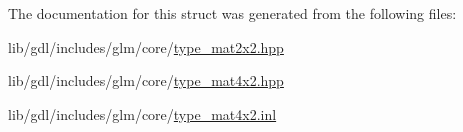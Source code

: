 The documentation for this struct was generated from the following files\+:\begin{DoxyCompactItemize}
\item 
lib/gdl/includes/glm/core/\hyperlink{type__mat2x2_8hpp}{type\+\_\+mat2x2.\+hpp}\item 
lib/gdl/includes/glm/core/\hyperlink{type__mat4x2_8hpp}{type\+\_\+mat4x2.\+hpp}\item 
lib/gdl/includes/glm/core/\hyperlink{type__mat4x2_8inl}{type\+\_\+mat4x2.\+inl}\end{DoxyCompactItemize}
